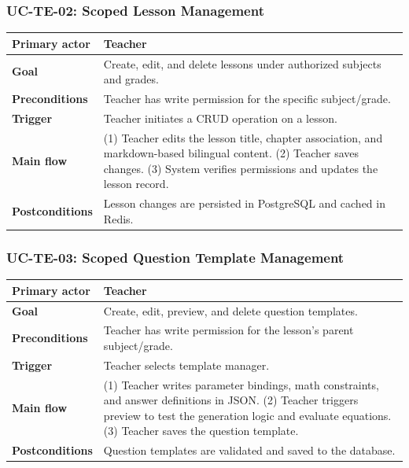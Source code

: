 \subsubsection{UC-TE-02: Scoped Lesson Management}
\begin{longtable}{L{0.28\textwidth}L{0.62\textwidth}}
\textbf{Primary actor} & Teacher \\ \hline
\textbf{Goal} & Create, edit, and delete lessons under authorized subjects and grades. \\ \hline
\textbf{Preconditions} & Teacher has write permission for the specific subject/grade. \\ \hline
\textbf{Trigger} & Teacher initiates a CRUD operation on a lesson. \\ \hline
\textbf{Main flow} & (1) Teacher edits the lesson title, chapter association, and markdown-based bilingual content. (2) Teacher saves changes. (3) System verifies permissions and updates the lesson record. \\ \hline
\textbf{Postconditions} & Lesson changes are persisted in PostgreSQL and cached in Redis. \\
\end{longtable}

\subsubsection{UC-TE-03: Scoped Question Template Management}
\begin{longtable}{L{0.28\textwidth}L{0.62\textwidth}}
\textbf{Primary actor} & Teacher \\ \hline
\textbf{Goal} & Create, edit, preview, and delete question templates. \\ \hline
\textbf{Preconditions} & Teacher has write permission for the lesson's parent subject/grade. \\ \hline
\textbf{Trigger} & Teacher selects template manager. \\ \hline
\textbf{Main flow} & (1) Teacher writes parameter bindings, math constraints, and answer definitions in JSON. (2) Teacher triggers preview to test the generation logic and evaluate equations. (3) Teacher saves the question template. \\ \hline
\textbf{Postconditions} & Question templates are validated and saved to the database. \\
\end{longtable}

